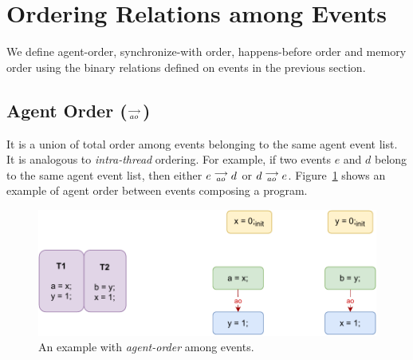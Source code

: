 \section{Ordering Relations among Events}
        
    We define agent-order, synchronize-with order, happens-before order and memory order using the binary relations defined on events in the previous section.

    \subsection{Agent Order ($\stackrel{\longrightarrow}{_{ao}}$)}
        It is a union of total order among events belonging to the same agent event list. 
        It is analogous to \textit{intra-thread} ordering. 
        For example, if two events $e$ and $d$ belong to the same agent event list, then either $e\stackrel{\longrightarrow}{_{ao}}d$ or $d\stackrel{\longrightarrow}{_{ao}}e$. 
        Figure~\ref{model:agent-order} shows an example of agent order between events composing a program.
        \begin{figure}[H]
            \centering
            \includegraphics[scale=0.7]{3.ECMAScriptMemoryModel/AgentOrder.pdf}
            \caption{An example with \textit{agent-order} among events.}
            \label{model:agent-order}
        \end{figure}
    

